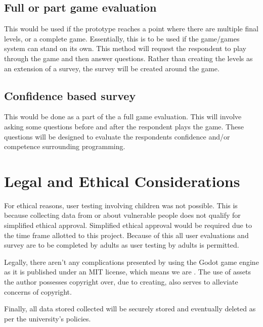 \subsection{Full or part game evaluation}

This would be used if the prototype reaches a point where there are multiple final levels, or a complete game. Essentially, this is to be used if the game/games system can stand on its own. This method will request the respondent to play through the game and then answer questions. Rather than creating the levels as an extension of a survey, the survey will be created around the game.

\subsection{Confidence based survey}

This would be done as a part of the a full game evaluation. This will involve asking some questions before and after the respondent plays the game. These questions will be designed to evaluate the respondents confidence and/or competence surrounding programming.

\section{Legal and Ethical Considerations}\label{sec:methodology/legal_and_ethical_considers}

For ethical reasons, user testing involving children was not possible. This is because collecting data from or about vulnerable people does not qualify for simplified ethical approval. Simplified ethical approval would be required due to the time frame allotted to this project. Because of this all user evaluations and survey are to be completed by adults as user testing by adults is permitted.

Legally, there aren't any complications presented by using the Godot game engine as it is published under an MIT license, which means we are  \citep{GodotLis}. The use of assets the author possesses copyright over, due to creating, also serves to alleviate concerns of copyright.

Finally, all data stored collected will be securely stored and eventually deleted as per the university's policies.